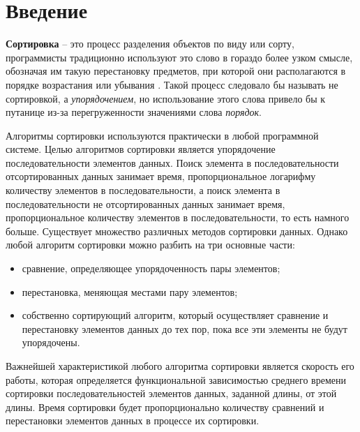 \chapter*{Введение}

\textbf{Сортировка} -- это процесс разделения объектов по виду или сорту, программисты традиционно используют это слово в гораздо более узком смысле, обозначая им такую перестановку предметов, при которой они располагаются в порядке возрастания или убывания \cite{knut}.
Такой процесс следовало бы называть не сортировкой, а \textit{упорядочением}, но использование этого слова привело бы к путанице из-за перегруженности значениями слова \textit{порядок}.

Алгоритмы сортировки используются практически в любой программной системе.
Целью алгоритмов сортировки является упорядочение последовательности элементов данных.
Поиск элемента в последовательности отсортированных данных занимает время, пропорциональное логарифму количеству элементов в последовательности, а поиск элемента в последовательности не отсортированных данных занимает время, пропорциональное количеству элементов в последовательности, то есть намного больше.
Существует множество различных методов сортировки данных.
Однако любой алгоритм сортировки можно разбить на три основные части:
\begin{itemize}
    \item сравнение, определяющее упорядоченность пары элементов;
    \item перестановка, меняющая местами пару элементов;
    \item собственно сортирующий алгоритм, который осуществляет сравнение и перестановку элементов данных до тех пор, пока все эти элементы не будут упорядочены.
\end{itemize}

Важнейшей характеристикой любого алгоритма сортировки является скорость его работы, которая определяется функциональной зависимостью среднего времени сортировки последовательностей элементов данных, заданной длины, от этой длины. Время сортировки будет пропорционально количеству сравнений и перестановки элементов данных в процессе их сортировки.
